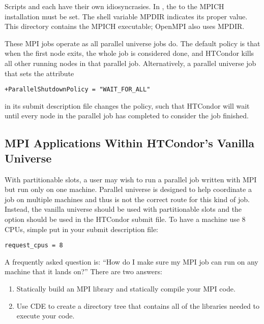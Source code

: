 Scripts  and 
each have their own idiosyncrasies.
In , the  to the MPICH installation must be set.
The shell variable MPDIR indicates its proper value.
This directory contains the MPICH  executable; OpenMPI also
uses MPDIR.

These MPI jobs operate as all parallel universe jobs do.
The default policy is that when the first node exits,
the whole job is considered done, 
and HTCondor kills all other running nodes in that parallel job.
Alternatively, a parallel universe job that sets the attribute
\begin{verbatim}
+ParallelShutdownPolicy = "WAIT_FOR_ALL"
\end{verbatim}
in its submit description file changes the policy,
such that HTCondor will wait until every node in the parallel 
job has completed to consider the job finished. 


\subsection{\label{sec:parallel-mpi-submit-single}MPI Applications Within HTCondor's Vanilla Universe}

With partitionable slots, a user may wish to run a parallel job written with
MPI but run only on one machine. Parallel universe is designed to help 
coordinate a job on multiple machines and thus is not the correct route for
this kind of job. Instead, the vanilla universe should be used with partitionable
slots and the  option should be used in the HTCondor submit
file. To have a machine use 8 CPUs, simple put in your submit description file:

\begin{verbatim}
request_cpus = 8
\end{verbatim}

A frequently asked question is: ``How do I make sure my MPI job can run 
on any machine that it lands on?'' There are two answers:
\begin{enumerate}
\item Statically build an MPI library and statically compile your MPI code.
\item Use CDE to create a directory tree that contains all of the libraries 
needed to execute your code.
\end{enumerate}

